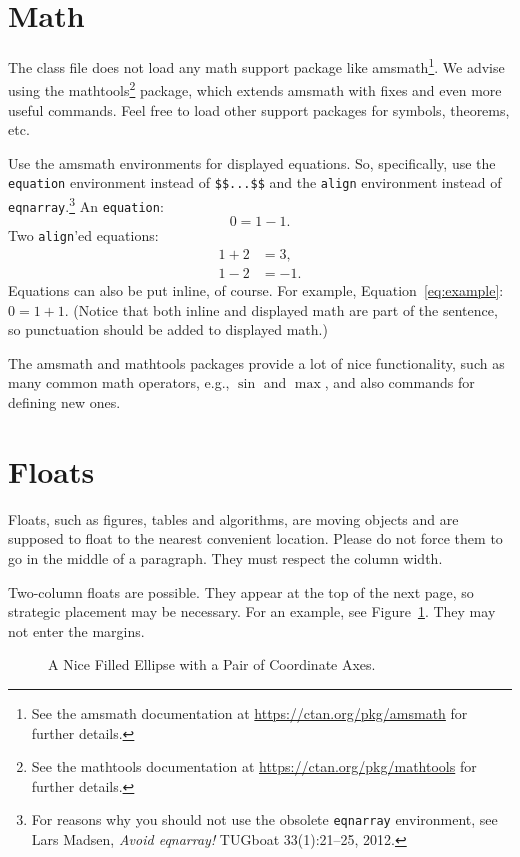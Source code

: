 \documentclass{uai2021} %
\begin{document}
\section{Math}\label{sec:math}
The class file does not load any math support package like \textsf{amsmath}\footnote{%
  See the \textsf{amsmath} documentation at \url{https://ctan.org/pkg/amsmath} for further details.
}.
We advise using the \textsf{mathtools}\footnote{%
  See the \textsf{mathtools} documentation at \url{https://ctan.org/pkg/mathtools} for further details.
}
package, which extends \textsf{amsmath} with fixes and even more useful commands.
Feel free to load other support packages for symbols, theorems, etc.

Use the \textsf{amsmath} environments for displayed equations.
So, specifically, use the \texttt{equation} environment instead of \verb|$$...$$| and the \texttt{align} environment instead of \texttt{eqnarray}.\footnote{For reasons why you should not use the obsolete \texttt{eqnarray} environment, see Lars Madsen, \textit{Avoid eqnarray!} TUGboat 33(1):21--25, 2012.}
An \texttt{equation}:
\begin{equation}\label{eq:example}
  0 = 1 - 1.
\end{equation}
Two \texttt{align}'ed equations:
\begin{align*} %
  1 + 2 &= 3,\\
  1 - 2 &= -1.
\end{align*}
Equations can also be put inline, of course.
For example, Equation~\eqref{eq:example}: \(0=1+1\). %
(Notice that both inline and displayed math are part of the sentence, so punctuation should be added to displayed math.)

The \textsf{amsmath} and \textsf{mathtools} packages provide a lot of nice functionality, such as many common math operators, e.g., \(\sin\) and \(\max\), and also commands for defining new ones.

\section{Floats}\label{sec:floats}
Floats, such as figures, tables and algorithms, are moving objects and are supposed to float to the nearest convenient location.
Please do not force them to go in the middle of a paragraph.
They must respect the column width.

Two-column floats are possible.
They appear at the top of the next page, so strategic placement may be necessary.
For an example, see Figure~\ref{fig:tikz}.
They may not enter the margins.
\begin{figure}
    \centering
    \caption{A Nice Filled Ellipse with a Pair of Coordinate Axes.}\label{fig:tikz}
\end{figure}
\end{document}
